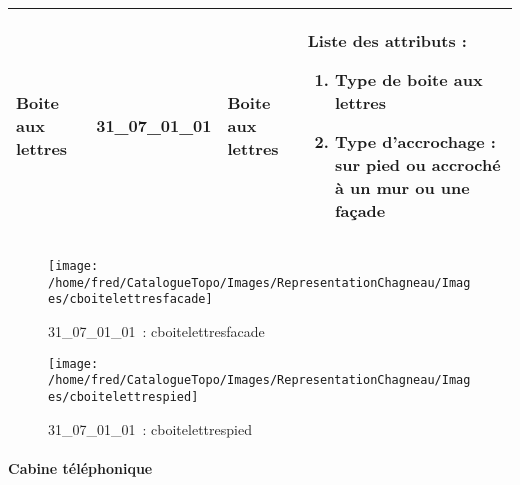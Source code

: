 \documentclass[12pt,titlepage]{book}
\begin{document}
\renewcommand{\arraystretch}{1.2}
\begin{supertabular}{|p{10cm}|c|p{13cm}|p{12cm}|}
 Boite aux lettres & 31\_07\_01\_01 & Boite aux lettres & Liste des attributs :
\begin{enumerate}
  \item Type de boite aux lettres  \item Type d'accrochage : sur pied ou accroché à un mur ou une façade\end{enumerate}
\\
\hline
\end{supertabular}
\begin{figure}[h!]
  \hfill         %
  \begin{minipage}[t]{3cm}
    \begin{center}
      \texttt{[image: /home/fred/CatalogueTopo/Images/RepresentationChagneau/Images/cboitelettresfacade]}
      \caption[~31\_07\_01\_01]{\small{31\_07\_01\_01~:} \tiny{cboitelettresfacade}}\label{cboitelettresfacade}
    \end{center}
  \end{minipage}
  \begin{minipage}[t]{3cm}
    \begin{center}
      \texttt{[image: /home/fred/CatalogueTopo/Images/RepresentationChagneau/Images/cboitelettrespied]}
      \caption[~31\_07\_01\_01]{\small{31\_07\_01\_01~:} \tiny{cboitelettrespied}}\label{cboitelettrespied}
    \end{center}
  \end{minipage}
\end{figure}


\paragraph{Cabine téléphonique}
\noindent
\vspace{\baselineskip}
\end{document}
